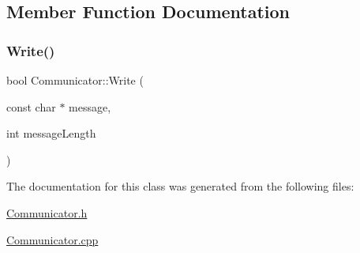 \subsection{Member Function Documentation}
\mbox{\label{class_communicator_adfc4f5c9dc389520bcd6d49214564b06}} 
\subsubsection{\texorpdfstring{Write()}{Write()}}
{\footnotesize\ttfamily bool Communicator\+::\+Write (\begin{DoxyParamCaption}\item[{const char $\ast$}]{message,  }\item[{int}]{message\+Length }\end{DoxyParamCaption})}



The documentation for this class was generated from the following files\+:\begin{DoxyCompactItemize}
\item 
\mbox{\hyperlink{_communicator_8h}{Communicator.\+h}}\item 
\mbox{\hyperlink{_communicator_8cpp}{Communicator.\+cpp}}\end{DoxyCompactItemize}
